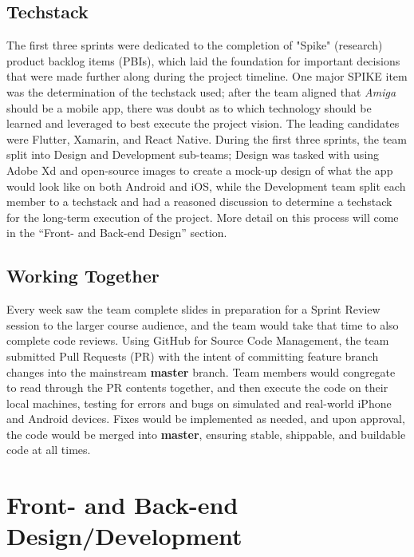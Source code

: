 \documentclass[10pt,american english]{article}
\begin{document}
\subsection*{Techstack}
The first three sprints were dedicated to the completion of "Spike" (research) product backlog items (PBIs), which laid the foundation for important decisions that were made further along during the project timeline. One major SPIKE item was the determination of the techstack used; after the team aligned that \textit{Amiga} should be a mobile app, there was doubt as to which technology should be learned and leveraged to best execute the project vision. The leading candidates were Flutter, Xamarin, and React Native. During the first three sprints, the team split into Design and Development sub-teams; Design was tasked with using Adobe Xd and open-source images to create a mock-up design of what the app would look like on both Android and iOS, while the Development team split each member to a techstack and had a reasoned discussion to determine a techstack for the long-term execution of the project. More detail on this process will come in the ``Front- and Back-end Design'' section.

\subsection*{Working Together}
Every week saw the team complete slides in preparation for a Sprint Review session to the larger course audience, and the team would take that time to also complete code reviews. Using GitHub for Source Code Management, the team submitted Pull Requests (PR) with the intent of committing feature branch changes into the mainstream \textbf{master} branch. Team members would congregate to read through the PR contents together, and then execute the code on their local machines, testing for errors and bugs on simulated and real-world iPhone and Android devices. Fixes would be implemented as needed, and upon approval, the code would be merged into \textbf{master}, ensuring stable, shippable, and buildable code at all times. 

\section*{Front- and Back-end Design/Development}
\end{document}
